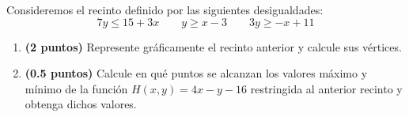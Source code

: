 
Consideremos el recinto definido por las siguientes desigualdades:
\[
  7y\leq 15+3x \qquad y\geq x-3 \qquad 3y\geq -x+11
\]

\begin{enumerate}[label=\alph*)]
  \item \textbf{(2 puntos)} Represente gráficamente el recinto anterior y
  calcule sus vértices.
  \item \textbf{(0.5 puntos)} Calcule en qué puntos se alcanzan los valores
  máximo y mínimo de la función $H(x,y)=4x-y-16$ restringida al anterior
  recinto y obtenga dichos valores.
\end{enumerate}
